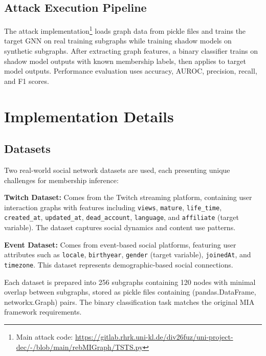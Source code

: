 \documentclass{article}
\begin{document}
\subsection{Attack Execution Pipeline}
The attack implementation\footnote{Main attack code: \url{https://gitlab.rhrk.uni-kl.de/div26fuz/uni-project-dec/-/blob/main/rebMIGraph/TSTS.py}} loads graph data from pickle files and trains the target GNN on real training subgraphs while training shadow models on synthetic subgraphs. After extracting graph features, a binary classifier trains on shadow model outputs with known membership labels, then applies to target model outputs. Performance evaluation uses accuracy, AUROC, precision, recall, and F1 scores.

\section{Implementation Details}
\subsection{Datasets}
Two real-world social network datasets are used, each presenting unique challenges for membership inference:

\textbf{Twitch Dataset:} Comes from the Twitch streaming platform, containing user interaction graphs with features including \texttt{views}, \texttt{mature}, \texttt{life\_time}, \texttt{created\_at}, \texttt{updated\_at}, \texttt{dead\_account}, \texttt{language}, and \texttt{affiliate} (target variable). The dataset captures social dynamics and content use patterns.

\textbf{Event Dataset:} Comes from event-based social platforms, featuring user attributes such as \texttt{locale}, \texttt{birthyear}, \texttt{gender} (target variable), \texttt{joinedAt}, and \texttt{timezone}. This dataset represents demographic-based social connections.

Each dataset is prepared into 256 subgraphs containing 120 nodes with minimal overlap between subgraphs, stored as pickle files containing (pandas.DataFrame, networkx.Graph) pairs. The binary classification task matches the original MIA framework requirements.
\end{document}
